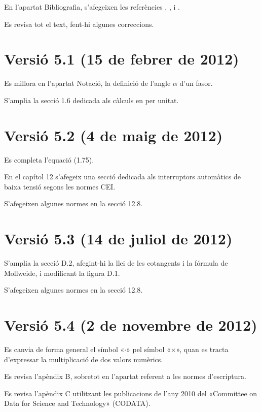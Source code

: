 En l'apartat Bibliografia, s'afegeixen les referències \cite{GRZ}, \cite{DUN}, \cite{REI} i \cite{TLE}.

Es revisa tot el text, fent-hi algunes correccions.

\section*{Versió 5.1 (15 de febrer de 2012)}

Es millora en l'apartat Notació, la definició de l'angle $\alpha$ d'un fasor.

S'amplia la secció 1.6 dedicada als càlculs en per unitat.


\section*{Versió 5.2 (4 de maig de 2012)}

Es completa l'equació (1.75).

En el capítol 12 s'afegeix una secció dedicada als interruptors automàtics de baixa tensió segons les normes CEI.

S'afegeixen algunes normes en la secció 12.8.

\section*{Versió 5.3 (14 de juliol de 2012)}

S'amplia la secció D.2, afegint-hi la llei de les cotangents i la fórmula de Mollweide, i modificant  la figura D.1.

S'afegeixen algunes normes en la secció 12.8.

\section*{Versió 5.4 (2 de novembre de 2012)}

Es canvia de forma general el símbol «$\cdot$» pel símbol «$\times$», quan es tracta d'expressar la multiplicació de dos valors numèrics.

Es revisa l'apèndix B, sobretot en l'apartat referent a les normes d'escriptura.

Es revisa l'apèndix C utilitzant les publicacions de l'any 2010 del «Committee on Data for Science and Technology» (CODATA).

